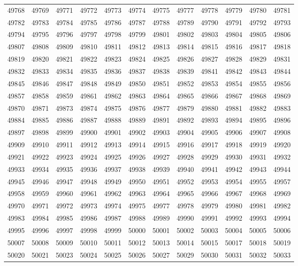 \begin{center}
\begin{longtable}{llllllllllll}
49768 &49769 &49771 &49772 &49773 &49774 &49775 &49777 &49778 &49779 &49780 &49781 \\
49782 &49783 &49784 &49785 &49786 &49787 &49788 &49789 &49790 &49791 &49792 &49793 \\
49794 &49795 &49796 &49797 &49798 &49799 &49801 &49802 &49803 &49804 &49805 &49806 \\
49807 &49808 &49809 &49810 &49811 &49812 &49813 &49814 &49815 &49816 &49817 &49818 \\
49819 &49820 &49821 &49822 &49823 &49824 &49825 &49826 &49827 &49828 &49829 &49831 \\
49832 &49833 &49834 &49835 &49836 &49837 &49838 &49839 &49841 &49842 &49843 &49844 \\
49845 &49846 &49847 &49848 &49849 &49850 &49851 &49852 &49853 &49854 &49855 &49856 \\
49857 &49858 &49859 &49861 &49862 &49863 &49864 &49865 &49866 &49867 &49868 &49869 \\
49870 &49871 &49873 &49874 &49875 &49876 &49877 &49879 &49880 &49881 &49882 &49883 \\
49884 &49885 &49886 &49887 &49888 &49889 &49891 &49892 &49893 &49894 &49895 &49896 \\
49897 &49898 &49899 &49900 &49901 &49902 &49903 &49904 &49905 &49906 &49907 &49908 \\
49909 &49910 &49911 &49912 &49913 &49914 &49915 &49916 &49917 &49918 &49919 &49920 \\
49921 &49922 &49923 &49924 &49925 &49926 &49927 &49928 &49929 &49930 &49931 &49932 \\
49933 &49934 &49935 &49936 &49937 &49938 &49939 &49940 &49941 &49942 &49943 &49944 \\
49945 &49946 &49947 &49948 &49949 &49950 &49951 &49952 &49953 &49954 &49955 &49957 \\
49958 &49959 &49960 &49961 &49962 &49963 &49964 &49965 &49966 &49967 &49968 &49969 \\
49970 &49971 &49972 &49973 &49974 &49975 &49977 &49978 &49979 &49980 &49981 &49982 \\
49983 &49984 &49985 &49986 &49987 &49988 &49989 &49990 &49991 &49992 &49993 &49994 \\
49995 &49996 &49997 &49998 &49999 &50000 &50001 &50002 &50003 &50004 &50005 &50006 \\
50007 &50008 &50009 &50010 &50011 &50012 &50013 &50014 &50015 &50017 &50018 &50019 \\
50020 &50021 &50023 &50024 &50025 &50026 &50027 &50029 &50030 &50031 &50032 &50033 \\

\end{longtable}
\end{center}
